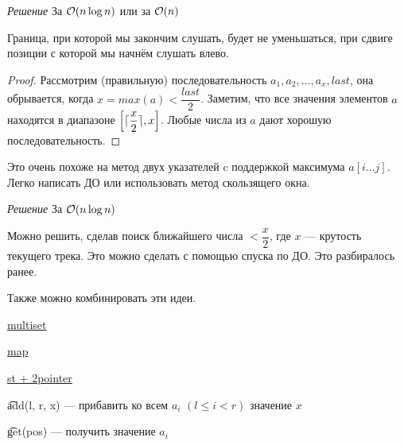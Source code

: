 \down

{\it Решение } За $ \mathcal{O}(n \log n)$ или за $\mathcal{O}(n)$ \href{https://codeforces.com/contest/1237/submission/62704110}{}

\begin{Prop}Граница, при которой мы закончим слушать, будет не уменьшаться, при сдвиге позиции с которой мы начнём слушать влево.\end{Prop}

\begin{proof}
	Рассмотрим (правильную) последовательность $a_1, a_2, \ldots, a_x, last$, она обрывается, когда $x=max(a) < \dfrac{last}{2}$. Заметим, что все значения элементов $a$ находятся в диапазоне $\left[\ceil{\dfrac{x}{2}}, x\right]$. Любые числа из $a$ дают хорошую последовательность.
\end{proof}

Это очень похоже на метод двух указателей c поддержкой максимума $a[i \ldots j]$. Легко написать ДО или использовать метод скользящего окна.

\down

{\it Решение } За $ \mathcal{O}(n \log n)$
\href{https://codeforces.com/contest/1237/submission/62700019}{}

Можно решить, сделав поиск ближайшего числа $< \dfrac{x}{2}$, где $x$ --- крутость текущего трека. Это можно сделать с помощью спуска по ДО. Это разбиралось ранее. 

Также можно комбинировать эти идеи.

\href{https://codeforces.com/contest/1237/submission/62700598}{multiset }

\href{https://codeforces.com/contest/1237/submission/62695687}{map }

\href{https://codeforces.com/contest/1237/submission/62712896}{st + 2pointer }

\pagebreak


\begin{MyList}[0pt]
	\item \t{add(l, r, x)} --- прибавить ко всем $a_i$ $(l \le i < r)$ значение $x$
	\item \t{get(pos)} --- получить значение $a_i$
\end{MyList}
\up \up


